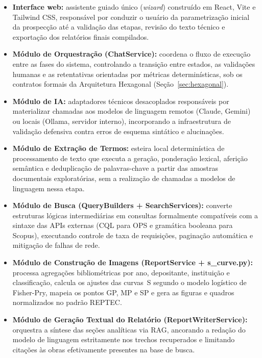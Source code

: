 \documentclass[12pt, a4paper]{article}
\begin{document}
  \begin{itemize}[leftmargin=*]
    \item \textbf{Interface web:} assistente guiado único (\textit{wizard}) construído em React, Vite e Tailwind CSS, responsável por conduzir o usuário da parametrização inicial da prospecção até a validação das etapas, revisão do texto técnico e exportação dos relatórios finais compilados.
    
    \item \textbf{Módulo de Orquestração (ChatService):} coordena o fluxo de execução entre as fases do sistema, controlando a transição entre estados, as validações humanas e as retentativas orientadas por métricas determinísticas, sob os contratos formais da Arquitetura Hexagonal (Seção~\ref{sec:hexagonal}).
    
    \item \textbf{Módulo de IA:} adaptadores técnicos desacoplados responsáveis por materializar chamadas aos modelos de linguagem remotos (Claude, Gemini) ou locais (Ollama, servidor interno), incorporando a infraestrutura de validação defensiva contra erros de esquema sintático e alucinações.
    
    \item \textbf{Módulo de Extração de Termos:} esteira local determinística de processamento de texto que executa a geração, ponderação lexical, aferição semântica e deduplicação de palavras-chave a partir das amostras documentais exploratórias, sem a realização de chamadas a modelos de linguagem nessa etapa.
    
    \item \textbf{Módulo de Busca (QueryBuilders + SearchServices):} converte estruturas lógicas intermediárias em consultas formalmente compatíveis com a sintaxe das APIs externas (CQL para OPS e gramática booleana para Scopus), executando controle de taxa de requisições, paginação automática e mitigação de falhas de rede.
    
    \item \textbf{Módulo de Construção de Imagens (ReportService + s\_curve.py):} processa agregações bibliométricas por ano, depositante, instituição e classificação, calcula os ajustes das curvas~S segundo o modelo logístico de Fisher-Pry, mapeia os pontos GP, MP e SP e gera as figuras e quadros normalizados no padrão REPTEC.
    
    \item \textbf{Módulo de Geração Textual do Relatório (ReportWriterService):} orquestra a síntese das seções analíticas via RAG, ancorando a redação do modelo de linguagem estritamente nos trechos recuperados e limitando citações às obras efetivamente presentes na base de busca.
    

\end{itemize}
\end{document}
